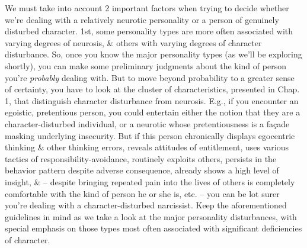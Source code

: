 \documentclass{article}
\numberwithin{equation}{section}
\begin{document}
We must take into account 2 important factors when trying to decide whether we're dealing with a relatively neurotic personality or a person of genuinely disturbed character. 1st, some personality types are more often associated with varying degrees of neurosis, \& others with varying degrees of character disturbance. So, once you know the major personality types (as we'll be exploring shortly), you can make some preliminary judgments about the kind of person you're \textit{probably} dealing with. But to move beyond probability to a greater sense of certainty, you have to look at the cluster of characteristics, presented in Chap. 1, that distinguish character disturbance from neurosis. E.g., if you encounter an egoistic, pretentious person, you could entertain either the notion that they are a character-disturbed individual, or a neurotic whose pretentiousness is a fa\c{c}ade masking underlying insecurity. But if this person chronically displays egocentric thinking \& other thinking errors, reveals attitudes of entitlement, uses various tactics of responsibility-avoidance, routinely exploits others, persists in the behavior pattern despite adverse consequence, already shows a high level of insight, \& -- despite bringing repeated pain into the lives of others is completely comfortable with the kind of person he or she is, etc. -- you can be lot surer you're dealing with a character-disturbed narcissist. Keep the aforementioned guidelines in mind as we take a look at the major personality disturbances, with special emphasis on those types most often associated with significant deficiencies of character.
\end{document}
